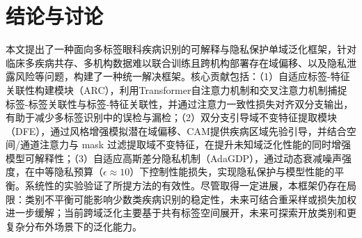 \section{结论与讨论}\label{ux7ed3ux8bbaux4e0eux8ba8ux8bba}

本文提出了一种面向多标签眼科疾病识别的可解释与隐私保护单域泛化框架，针对临床多疾病共存、多机构数据难以联合训练且跨机构部署存在域偏移、以及隐私泄露风险等问题，构建了一种统一解决框架。核心贡献包括：（1）自适应标签-特征关联性构建模块（ARC），利用Transformer自注意力机制和交叉注意力机制捕捉标签-标签关联性与标签-特征关联性，并通过注意力一致性损失对齐双分支输出，有助于减少多标签识别中的误检与漏检；（2）双分支引导域不变特征提取模块（DFE），通过风格增强模拟潜在域偏移、CAM提供疾病区域先验引导，并结合空间/通道注意力与 mask 过滤提取域不变特征，在提升未知域泛化性能的同时增强模型可解释性；（3）自适应高斯差分隐私机制（AdaGDP），通过动态衰减噪声强度，在中等隐私预算（\(\epsilon \approx 10\)）下控制性能损失，实现隐私保护与模型性能的平衡。系统性的实验验证了所提方法的有效性。尽管取得一定进展，本框架仍存在局限：类别不平衡可能影响少数类疾病识别的稳定性，未来可结合重采样或损失加权进一步缓解；当前跨域泛化主要基于共有标签空间展开，未来可探索开放类别和更复杂分布外场景下的泛化能力。
